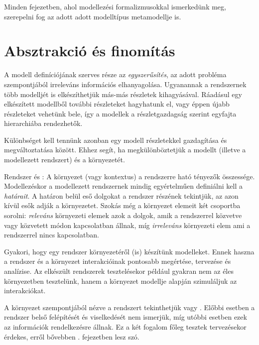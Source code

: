 \begin{tipp}
	Minden fejezetben, ahol modellezési formalizmusokkal ismerkedünk meg, szerepelni fog az adott adott modelltípus metamodellje is.
\end{tipp}


\section{Absztrakció és finomítás}

A modell definíciójának szerves része az \emph{egyszerűsítés}, az adott probléma szempontjából irreleváns információs elhanyagolása. Ugyanannak a rendszernek több modelljét is elkészíthetjük más-más részletek kihagyásával. Ráadásul egy elkészített modellből további részleteket hagyhatunk el, vagy éppen újabb részleteket vehetünk bele, így a modellek a részletgazdagság szerint egyfajta hierarchiába rendezhetők.

Különbséget kell tennünk azonban egy modell részletekkel gazdagítása és megváltoztatása között. Ehhez segít, ha megkülönböztetjük a modellt (illetve a modellezett rendszert) és a környezetét.

\begin{definicio}
	Rendszer és : A környezet (vagy kontextus) a rendszerre ható tényezők összessége. Modellezéskor a modellezett rendszernek mindig egyértelműen definiálni kell a \emph{határait}. A határon belül eső dolgokat a rendszer részének tekintjük, az azon kívül esők adják a környezetet. Szokás még a környezet elemeit két csoportba sorolni: \emph{releváns} környezeti elemek azok a dolgok, amik a rendszerrel közvetve vagy közvetett módon kapcsolatban állnak, míg \emph{irreleváns} környezeti elem ami a rendszerrel nincs kapcsolatban.
\end{definicio}

\begin{megjegyzes}
	Gyakori, hogy egy rendszer környezetéről (is) készítünk modelleket. Ennek haszna a rendszer és a környezet interakcióinak pontosabb megértése, tervezése és analízise. Az elkészült rendszerek tesztelésekor például gyakran nem az éles környezetben tesztelünk, hanem a környezet modellje alapján szimuláljuk az interakciókat.
	
	A környezet szempontjából nézve a rendszert tekinthetjük  vagy . Előbbi esetben a rendszer belső felépítését és viselkedését nem ismerjük, míg utóbbi esetben ezek az információk rendelkezésre állnak. Ez a két fogalom főleg tesztek tervezésekor érdekes, erről bővebben . fejezetben lesz szó.
\end{megjegyzes}

